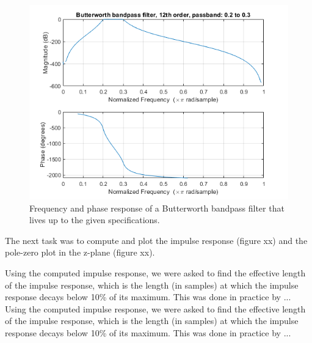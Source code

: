 \documentclass[journal]{IEEEtran}
\begin{document}
\begin{figure} [H]
    \centering
    \includegraphics[width=\linewidth]{assignment_02/plots/butterbandfreq.png}
    \caption{Frequency and phase response of a Butterworth bandpass filter that lives up to the given specifications.}
    \label{fig:butterband}
\end{figure}

The next task was to compute and plot the impulse response (figure xx) and the pole-zero plot in the z-plane (figure xx). 

Using the computed impulse response, we were asked to find the effective length of the impulse response, which is the length (in samples) at which the impulse response decays below 10\% of its maximum. This was done in practice by ...
Using the computed impulse response, we were asked to find the effective length of the impulse response, which is the length (in samples) at which the impulse response decays below 10\% of its maximum. This was done in practice by ...
\end{document}

